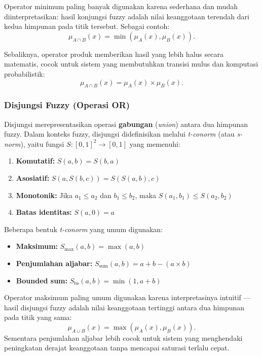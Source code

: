 \documentclass[12pt,a4paper]{article}
\theoremstyle{remark}
\begin{document}
Operator minimum paling banyak digunakan karena sederhana dan mudah diinterpretasikan: hasil konjungsi fuzzy adalah nilai keanggotaan terendah dari kedua himpunan pada titik tersebut.
Sebagai contoh:
\begin{equation}
    \label{eq:konjungsi_minimum}
    \mu_{A \cap B}(x) = \min(\mu_A(x), \mu_B(x)).
\end{equation}

Sebaliknya, operator produk memberikan hasil yang lebih halus secara matematis, cocok untuk sistem yang membutuhkan transisi mulus dan komputasi probabilistik:
\[
    \mu_{A \cap B}(x) = \mu_A(x) \times \mu_B(x).
\]

\subsubsection{Disjungsi Fuzzy (Operasi OR)}
Disjungsi merepresentasikan operasi \textbf{gabungan} (\textit{union}) antara dua himpunan fuzzy. Dalam konteks fuzzy, disjungsi didefinisikan melalui \textit{t-conorm} (atau \textit{s-norm}), yaitu fungsi \(S: [0,1]^2 \to [0,1]\) yang memenuhi:
\begin{enumerate}
    \item \textbf{Komutatif:} \(S(a,b) = S(b,a)\)
    \item \textbf{Asosiatif:} \(S(a, S(b,c)) = S(S(a,b), c)\)
    \item \textbf{Monotonik:} Jika \(a_1 \leq a_2\) dan \(b_1 \leq b_2\), maka \(S(a_1,b_1) \leq S(a_2,b_2)\)
    \item \textbf{Batas identitas:} \(S(a,0) = a\)
\end{enumerate}

Beberapa bentuk \textit{t-conorm} yang umum digunakan:
\begin{itemize}
    \item \textbf{Maksimum:} \(S_{\max}(a,b) = \max(a,b)\)
    \item \textbf{Penjumlahan aljabar:} \(S_{\text{sum}}(a,b) = a + b - (a \times b)\)
    \item \textbf{Bounded sum:} \(S_{\text{bs}}(a,b) = \min(1, a + b)\)
\end{itemize}

Operator maksimum paling umum digunakan karena interpretasinya intuitif — hasil disjungsi fuzzy adalah nilai keanggotaan tertinggi antara dua himpunan pada titik yang sama:
\[
    \mu_{A \cup B}(x) = \max(\mu_A(x), \mu_B(x)).
\]
Sementara penjumlahan aljabar lebih cocok untuk sistem yang menghendaki peningkatan derajat keanggotaan tanpa mencapai saturasi terlalu cepat.
\end{document}
